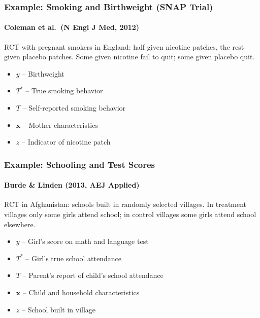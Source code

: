 \documentclass{beamer}
\begin{document}
\begin{frame}
  \frametitle{Example: Smoking and Birthweight (SNAP Trial)}
\framesubtitle{Coleman et al.\ (N Engl J Med, 2012)}
  RCT with pregnant smokers in England: half given nicotine patches, the rest given placebo patches.
  Some given nicotine fail to quit; some given placebo quit.
\begin{itemize}
  \item $y$ -- Birthweight 
  \item $T^*$ -- True smoking behavior 
  \item $T$ -- Self-reported smoking behavior
  \item $\mathbf{x}$ -- Mother characteristics
  \item $z$ -- Indicator of nicotine patch
\end{itemize}
\end{frame}
\begin{frame}
  \frametitle{Example: Schooling and Test Scores}
\framesubtitle{Burde \& Linden (2013, AEJ Applied)}
  RCT in Afghanistan: schools built in randomly selected villages.
  In treatment villages only some girls attend school; in control villages some girls attend school elsewhere.

\begin{itemize}
  \item $y$ -- Girl's score on math and language test 
  \item $T^*$ -- Girl's true school attendance
  \item $T$ -- Parent's report of child's school attendance
  \item $\mathbf{x}$ -- Child and household characteristics
  \item $z$ -- School built in village
\end{itemize}
\end{frame}
\end{document}
